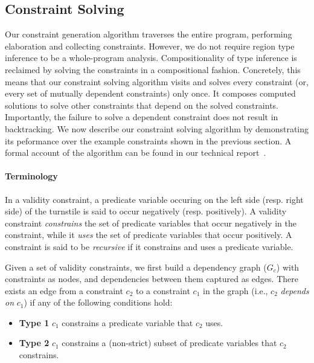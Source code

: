 \subsection{Constraint Solving}
\label{sec:fb-constraintsolving}

Our constraint generation algorithm traverses the entire program,
performing elaboration and collecting constraints. However, we do not
require region type inference to be a whole-program analysis.
Compositionality of type inference is reclaimed by solving the
constraints in a compositional fashion. Concretely, this means that
our constraint solving algorithm visits and solves every constraint
(or, every set of mutually dependent constraints) only once. It
composes computed solutions to solve other constraints that depend on
the solved constraints. Importantly, the failure to solve a dependent
constraint does not result in backtracking. We now describe our
constraint solving algorithm by demonstrating its peformance over the
example constraints shown in the previous section. A formal account of
the algorithm can be found in our technical report~\cite{techrep}.

\paragraph{Terminology} In a validity constraint, a predicate variable
occuring on the left side (resp. right side) of the turnstile is said
to occur negatively (resp. positively). A validity constraint
\emph{constrains} the set of predicate variables that occur negatively
in the constraint, while it \emph{uses} the set of predicate variables
that occur positively. A constraint is said to be \emph{recursive} if
it constrains and uses a predicate variable.

Given a set of validity constraints, we first build a dependency graph
($G_c$) with constraints as nodes, and dependencies between them
captured as edges. There exists an edge from a constraint $c_2$ to a
constraint $c_1$ in the graph (i.e., $c_2$ \emph{depends on} $c_1$) if
any of the following conditions hold:
\begin{itemize}
\item \textbf{Type 1} $c_1$ constrains a predicate variable that $c_2$ uses. 
\item \textbf{Type 2} $c_1$ constrains a (non-strict) subset of predicate variables
that $c_2$ constrains.
\end{itemize}

